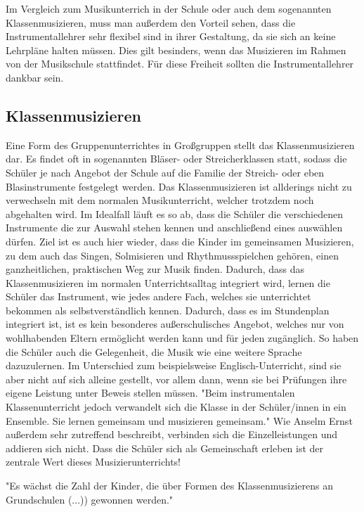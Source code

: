 Im Vergleich zum Musikunterrich in der Schule oder auch dem sogenannten
Klassenmusizieren, muss man außerdem den Vorteil sehen, dass die
Instrumentallehrer sehr flexibel sind in ihrer Gestaltung, da sie sich an keine
Lehrpläne halten müssen. Dies gilt besinders, wenn das Musizieren im Rahmen von
der Musikschule stattfindet. Für diese Freiheit sollten die Instrumentallehrer
dankbar sein.



\subsection{Klassenmusizieren}
Eine Form des Gruppenunterrichtes in Großgruppen stellt das Klassenmusizieren
dar. Es findet oft in sogenannten Bläser- oder Streicherklassen statt, sodass
die Schüler je nach Angebot der Schule auf die Familie der Streich- oder eben
Blasinstrumente festgelegt werden. Das Klassenmusizieren ist allderings nicht zu
verwechseln mit dem normalen Musikunterricht, welcher trotzdem noch abgehalten
wird. Im Idealfall läuft es so ab, dass die Schüler die verschiedenen
Instrumente die zur Auswahl stehen kennen und anschließend eines auswählen
dürfen. Ziel ist es auch hier wieder, dass die Kinder im gemeinsamen Musizieren,
zu dem auch das Singen, Solmisieren und Rhythmussspielchen gehören, einen
ganzheitlichen, praktischen Weg zur Musik finden.
\autocite[91]{ernst:die_zukunftsfaehige_musikschule} Dadurch, dass das
Klassenmusizieren im normalen Unterrichtsalltag integriert wird, lernen die
Schüler das Instrument, wie jedes andere Fach, welches sie unterrichtet bekommen
als selbstverständlich kennen. Dadurch, dass es im Stundenplan integriert ist,
ist es kein besonderes außerschulisches Angebot, welches nur von wohlhabenden
Eltern ermöglicht werden kann und für jeden zugänglich. So haben die Schüler
auch die Gelegenheit, die Musik wie eine weitere Sprache dazuzulernen. Im
Unterschied zum beispielsweise Englisch-Unterricht, sind sie aber nicht auf sich
alleine gestellt, vor allem dann, wenn sie bei Prüfungen ihre eigene Leistung
unter Beweis stellen müssen. "Beim instrumentalen Klassenunterricht jedoch
verwandelt sich die Klasse in der Schüler/innen in ein Ensemble. Sie lernen
gemeinsam und musizieren gemeinsam."
\autocite[92]{ernst:die_zukunftsfaehige_musikschule} Wie Anselm Ernst außerdem
sehr zutreffend beschreibt, verbinden sich die Einzelleistungen und addieren
sich nicht. Dass die Schüler sich als Gemeinschaft erleben ist der zentrale Wert
dieses Musizierunterrichts!

"Es wächst die Zahl der Kinder, die über Formen des Klassenmusizierens an
Grundschulen (...)) gewonnen werden." %


